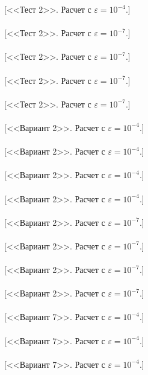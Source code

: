 \documentclass[12pt,a4paper]{article}
\begin{document}
[<<Тест 2>>. Расчет с $\varepsilon=10^{-4}$.]\\
\\
[<<Тест 2>>. Расчет с $\varepsilon=10^{-7}$.]\\
\\
[<<Тест 2>>. Расчет с $\varepsilon=10^{-7}$.]\\
\\
[<<Тест 2>>. Расчет с $\varepsilon=10^{-7}$.]\\
\\
[<<Тест 2>>. Расчет с $\varepsilon=10^{-7}$.]\\
\\
[<<Вариант 2>>. Расчет с $\varepsilon=10^{-4}$.]\\
\\
[<<Вариант 2>>. Расчет с $\varepsilon=10^{-4}$.]\\
\\
[<<Вариант 2>>. Расчет с $\varepsilon=10^{-4}$.]\\
\\
[<<Вариант 2>>. Расчет с $\varepsilon=10^{-4}$.]\\
\\
[<<Вариант 2>>. Расчет с $\varepsilon=10^{-7}$.]\\
\\
[<<Вариант 2>>. Расчет с $\varepsilon=10^{-7}$.]\\
\\
[<<Вариант 2>>. Расчет с $\varepsilon=10^{-7}$.]\\
\\
[<<Вариант 2>>. Расчет с $\varepsilon=10^{-7}$.]\\
\\
[<<Вариант 7>>. Расчет с $\varepsilon=10^{-4}$.]\\
\\
[<<Вариант 7>>. Расчет с $\varepsilon=10^{-4}$.]\\
\\
[<<Вариант 7>>. Расчет с $\varepsilon=10^{-4}$.]\\
\\
\end{document}
